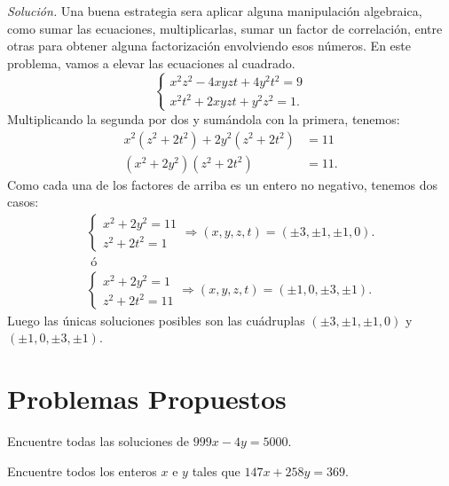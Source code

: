 \documentclass[12pt]{scrartcl}
\begin{document}
\textit{Solución.} Una buena estrategia sera aplicar alguna manipulación algebraica, como sumar las ecuaciones, multiplicarlas, sumar un factor de correlación, entre otras para obtener alguna factorización envolviendo esos números. En este problema, vamos a elevar las ecuaciones al cuadrado.$$\left\lbrace \begin{array}{c}
x^2z^2-4xyzt+4y^2t^2 = 9\\ x^2t^2+2xyzt+y^2z^2=1.
\end{array}\right.$$
Multiplicando la segunda por dos y sumándola con la primera, tenemos: \begin{align*}
x^2(z^2+2t^2)+2y^2(z^2+2t^2) & = 11\\
(x^2+2y^2)(z^2+2t^2) & = 11.
\end{align*}
Como cada una de los factores de arriba es un entero no negativo, tenemos dos casos: \begin{align*}
\left\lbrace \begin{array}{c}
x^2+2y^2 =11 \\ z^2+2t^2=1
\end{array}\right. \Rightarrow (x,y,z,t)=(\pm 3,\pm 1, \pm 1, 0).\\
\mbox{ ó }\\
\left\lbrace \begin{array}{c}
x^2+2y^2 =1 \\ z^2+2t^2=11
\end{array}\right. \Rightarrow (x,y,z,t)=(\pm 1,0, \pm 3, \pm 1).
\end{align*}
Luego las únicas soluciones posibles son las cuádruplas $(\pm 3,\pm 1, \pm 1, 0)$ y $(\pm 1,0, \pm 3, \pm 1)$.

\section{Problemas Propuestos}

\begin{problem}
Encuentre todas las soluciones de $999x-4y=5000$.
  \begin{hint}
  
  \end{hint}
\end{problem}

\begin{problem}
Encuentre todos los enteros $x$ e $y$ tales que $147x+258y=369$.
  \begin{hint}
  
  \end{hint}
\end{problem}
\end{document}
